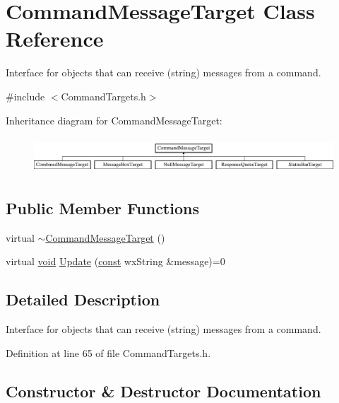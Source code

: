 \hypertarget{class_command_message_target}{}\section{Command\+Message\+Target Class Reference}
\label{class_command_message_target}


Interface for objects that can receive (string) messages from a command.  




{\ttfamily \#include $<$Command\+Targets.\+h$>$}

Inheritance diagram for Command\+Message\+Target\+:\begin{figure}[H]
\begin{center}
\leavevmode
\includegraphics[height=1.374233cm]{class_command_message_target}
\end{center}
\end{figure}
\subsection*{Public Member Functions}
\begin{DoxyCompactItemize}
\item 
virtual \hyperlink{class_command_message_target_a28ad986adb10ca9dde2c5d526f4452ee}{$\sim$\+Command\+Message\+Target} ()
\item 
virtual \hyperlink{sound_8c_ae35f5844602719cf66324f4de2a658b3}{void} \hyperlink{class_command_message_target_a6fcfc7d12905e2895384e4f92344a2d4}{Update} (\hyperlink{getopt1_8c_a2c212835823e3c54a8ab6d95c652660e}{const} wx\+String \&message)=0
\end{DoxyCompactItemize}


\subsection{Detailed Description}
Interface for objects that can receive (string) messages from a command. 

Definition at line 65 of file Command\+Targets.\+h.



\subsection{Constructor \& Destructor Documentation}
